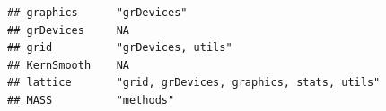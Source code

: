 \documentclass[]{article}
\begin{document}
\begin{verbatim}
## graphics      "grDevices"                                                                                                                                                                                                                                                                                                                                                                                                                                                                           
## grDevices     NA                                                                                                                                                                                                                                                                                                                                                                                                                                                                                    
## grid          "grDevices, utils"                                                                                                                                                                                                                                                                                                                                                                                                                                                                    
## KernSmooth    NA                                                                                                                                                                                                                                                                                                                                                                                                                                                                                    
## lattice       "grid, grDevices, graphics, stats, utils"                                                                                                                                                                                                                                                                                                                                                                                                                                             
## MASS          "methods"                                                                                                                                                                                                                                                                                                                                                                                                                                                                             

\end{verbatim}
\end{document}
